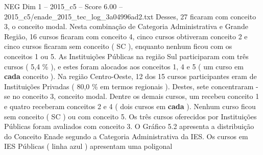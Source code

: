 \begin{textsample}{NEG Dim 1 – 2015\_c5 – Score 6.00 – 2015\_c5/enade\_2015\_tec\_log\_3a04996ad2.txt}
Desses, 27 ficaram com conceito 3, o conceito modal.
Nesta combinação de Categoria Administrativa e Grande Região, 16 cursos ficaram com conceito 4, cinco cursos obtiveram conceito 2 e cinco cursos ficaram sem conceito ( SC ), enquanto nenhum ficou com os conceitos 1 ou 5.
As Instituições Públicas na região Sul participaram com três cursos ( 5,4 \% ), e estes foram alocados aos conceitos 1, 4 e 5 ( um curso em \textbf{cada} conceito ).
Na região Centro-Oeste, 12 dos 15 cursos participantes eram de Instituições Privadas ( 80,0 \% em termos regionais ).
Destes, sete concentraram -se no conceito 3, conceito modal.
Dentre os demais cursos, um recebeu conceito 1 e quatro receberam conceitos 2 e 4 ( dois cursos em \textbf{cada} ).
Nenhum curso ficou sem conceito ( SC ) ou com conceito 5.
Os três cursos oferecidos por Instituições Públicas foram avaliados com conceito 3.
O Gráfico 5.2 apresenta a distribuição do Conceito Enade segundo a Categoria Administrativa da IES.
Os cursos em IES Públicas ( linha azul ) apresentam uma poligonal

\end{textsample}
